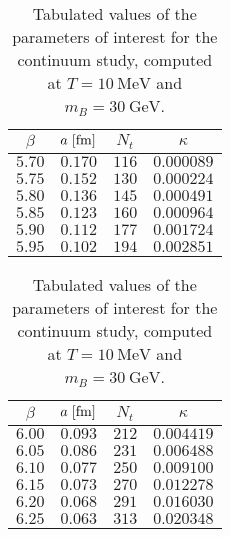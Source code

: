 \begin{table}
  \begin{center}
  \begin{tabular}{cccc}
    $\beta$ & $a\hskip .1cm[\mathrm{fm}]$ & $N_t$ & $\kappa$ \\ \toprule
    $5.70$ & $0.170$ & $116$ & $0.000089$ \\
    $5.75$ & $0.152$ & $130$ & $0.000224$ \\
    $5.80$ & $0.136$ & $145$ & $0.000491$ \\
    $5.85$ & $0.123$ & $160$ & $0.000964$ \\
    $5.90$ & $0.112$ & $177$ & $0.001724$ \\
    $5.95$ & $0.102$ & $194$ & $0.002851$ \\ \bottomrule
  \end{tabular} \hskip 1cm
  \begin{tabular}{cccc}
    $\beta$ & $a\hskip .1cm[\mathrm{fm}]$ & $N_t$ & $\kappa$ \\ \toprule
    $6.00$ & $0.093$ & $212$ & $0.004419$ \\
    $6.05$ & $0.086$ & $231$ & $0.006488$ \\
    $6.10$ & $0.077$ & $250$ & $0.009100$ \\
    $6.15$ & $0.073$ & $270$ & $0.012278$ \\
    $6.20$ & $0.068$ & $291$ & $0.016030$ \\
    $6.25$ & $0.063$ & $313$ & $0.020348$ \\ \bottomrule
  \end{tabular} %
  \end{center}
  \caption{Tabulated values of the parameters of interest for the continuum
    study, computed at $T = 10 \:\mathrm{MeV}$ and $m_B = 30 \:\mathrm{GeV}$.}
  \label{tab:parameter_values}
\end{table}

